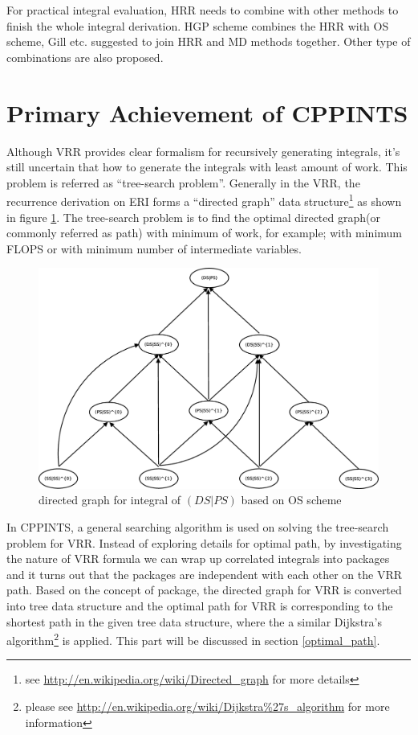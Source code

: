 For practical integral evaluation, HRR needs to combine with other
methods to finish the whole integral derivation. HGP\cite{HGP} scheme combines the HRR with OS scheme,
Gill etc. \cite{gill1989efficient, gill1990efficient}suggested to join HRR and MD methods together. 
Other type of combinations are also proposed\cite{lindh1991reduced,new_hrr_Schaefer}.

\section{Primary Achievement of CPPINTS}
%
%
%
Although VRR provides clear formalism for recursively generating integrals, it's still 
uncertain that how to generate the integrals with least amount of work. This problem is 
referred as ``tree-search problem''\cite{HGP}. Generally in the VRR, the recurrence derivation on 
ERI forms a ``directed graph'' data structure\footnote{see 
\url{http://en.wikipedia.org/wiki/Directed_graph} for more details} as shown in figure \ref{fig:1}. 
The tree-search problem is to find the optimal directed graph(or commonly referred as path) with 
minimum of work, for example; with minimum FLOPS or with minimum number of intermediate variables. 

 \begin{figure}[htb]
 \centering
 \includegraphics[scale=0.25]{./graph.eps}
 \caption{directed graph for integral of $(DS|PS)$ based on OS scheme}
 \label{fig:1}
\end{figure}

In CPPINTS, a general searching algorithm is used on solving the tree-search problem for 
VRR. Instead of exploring details for optimal path, by
investigating the nature of VRR formula we can wrap up correlated integrals into packages
and it turns out that the packages are independent with each other on the VRR path. Based on
the concept of package, the directed graph for VRR is converted into tree data structure and the optimal
path for VRR is corresponding to the shortest path in the given tree data structure, where the
a similar Dijkstra's algorithm\footnote{please see 
\url{http://en.wikipedia.org/wiki/Dijkstra\%27s_algorithm} for more information} is applied.
This part will be discussed in section \ref{optimal_path}.

